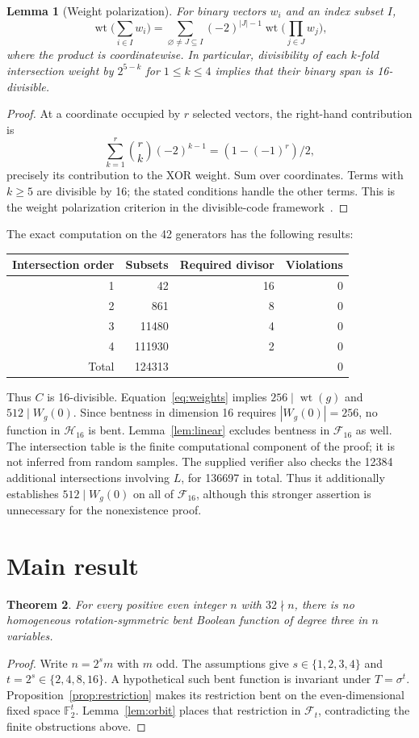 \documentclass[11pt,a4paper]{article}
\newtheorem{theorem}{Theorem}[section]
\newtheorem{lemma}[theorem]{Lemma}
\newcommand{\F}{\mathbb F_2}
\newcommand{\wt}{\operatorname{wt}}
\begin{document}
\begin{lemma}[Weight polarization]\label{lem:ward}
For binary vectors $w_i$ and an index subset $I$,
\[
 \wt\Big(\sum_{i\in I}w_i\Big)=
 \sum_{\varnothing\ne J\subseteq I}(-2)^{|J|-1}
 \wt\Big(\prod_{j\in J}w_j\Big),
\]
where the product is coordinatewise. In particular, divisibility of each $k$-fold intersection weight by $2^{5-k}$ for $1\le k\le4$ implies that their binary span is 16-divisible.
\end{lemma}
\begin{proof}
At a coordinate occupied by $r$ selected vectors, the right-hand contribution is
\[
\sum_{k=1}^r\binom rk(-2)^{k-1}=(1-(-1)^r)/2,
\]
precisely its contribution to the XOR weight. Sum over coordinates. Terms with $k\ge5$ are divisible by 16; the stated conditions handle the other terms. This is the weight polarization criterion in the divisible-code framework~\cite{ward}.
\end{proof}

The exact computation on the 42 generators has the following results:
\begin{center}
\begin{tabular}{rrrr}
\toprule
Intersection order & Subsets & Required divisor & Violations\\
\midrule
1&42&16&0\\
2&861&8&0\\
3&11480&4&0\\
4&111930&2&0\\
\midrule
Total&124313&&0\\
\bottomrule
\end{tabular}
\end{center}
Thus $C$ is 16-divisible. Equation~\ref{eq:weights} implies $256\mid\wt(g)$ and $512\mid W_g(0)$. Since bentness in dimension 16 requires $|W_g(0)|=256$, no function in $\mathcal H_{16}$ is bent. Lemma~\ref{lem:linear} excludes bentness in $\mathcal F_{16}$ as well. The intersection table is the finite computational component of the proof; it is not inferred from random samples. The supplied verifier also checks the 12384 additional intersections involving $L$, for 136697 in total. Thus it additionally establishes $512\mid W_g(0)$ on all of $\mathcal F_{16}$, although this stronger assertion is unnecessary for the nonexistence proof.

\section{Main result}
\begin{theorem}
For every positive even integer $n$ with $32\nmid n$, there is no homogeneous rotation-symmetric bent Boolean function of degree three in $n$ variables.
\end{theorem}
\begin{proof}
Write $n=2^s m$ with $m$ odd. The assumptions give $s\in\{1,2,3,4\}$ and $t=2^s\in\{2,4,8,16\}$. A hypothetical such bent function is invariant under $T=\sigma^t$. Proposition~\ref{prop:restriction} makes its restriction bent on the even-dimensional fixed space $\F^t$. Lemma~\ref{lem:orbit} places that restriction in $\mathcal F_t$, contradicting the finite obstructions above.
\end{proof}
\end{document}
